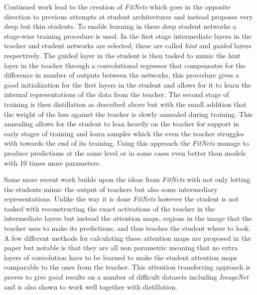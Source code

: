 \documentclass{kththesis}
\newcommand{\bibentry}[1]{\parencite{#1}}
\begin{document}
Continued work lead to the creation of \emph{FitNets} \bibentry{romero2014fitnets} which goes in the opposite direction to previous attempts at student architectures and instead proposes very deep but thin students. To enable learning in these deep student networks a stage-wise training procedure is used. In the first stage intermediate layers in the teacher and student networks are selected, these are called \emph{hint} and \emph{guided} layers respectively. The guided layer in the student is then tasked to mimic the hint layer in the teacher through a convolutional regressor that compensates for the difference in number of outputs between the networks, this procedure gives a good initialization for the first layers in the student and allows for it to learn the internal representations of the data from the teacher. The second stage of training is then distillation as described above but with the small addition that the weight of the loss against the teacher is slowly annealed during training. This annealing allows for the student to lean heavily on the teacher for support in early stages of training and learn samples which the even the teacher struggles with towards the end of its training. Using this approach the \emph{FitNets} manage to produce predictions at the same level or in some cases even better than models with 10 times more parameters.

Some more recent work \bibentry{zagouruyko2017paying} builds upon the ideas from \emph{FitNets} with not only letting the students mimic the output of teachers but also some intermediary representations. Unlike the way it is done \emph{FitNets} however the student is not tasked with reconstructing the exact activations of the teacher in the intermediate layers but instead the attention maps, regions in the image that the teacher uses to make its predictions, and thus teaches the student where to look. A few different methods for calculating these attention maps are proposed in the paper but notable is that they are all non parametric meaning that no extra layers of convolution have to be learned to make the student attention maps comparable to the ones from the teacher. This attention transferring approach is proves to give good results on a number of difficult datasets including \emph{ImageNet} and is also shown to work well together with distillation.
\end{document}
